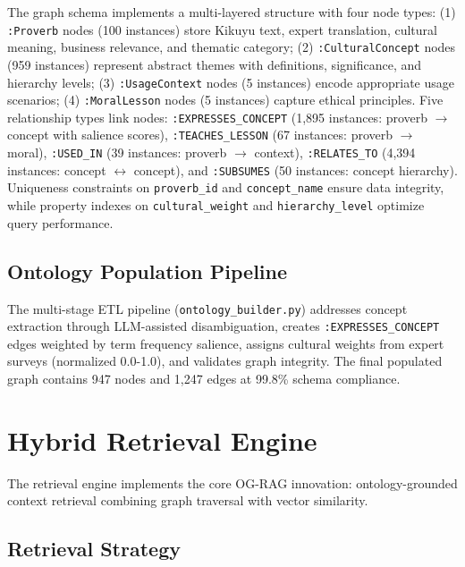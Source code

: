 The graph schema implements a multi-layered structure with four node types: (1) \texttt{:Proverb} nodes (100 instances) store Kikuyu text, expert translation, cultural meaning, business relevance, and thematic category; (2) \texttt{:CulturalConcept} nodes (959 instances) represent abstract themes with definitions, significance, and hierarchy levels; (3) \texttt{:UsageContext} nodes (5 instances) encode appropriate usage scenarios; (4) \texttt{:MoralLesson} nodes (5 instances) capture ethical principles. Five relationship types link nodes: \texttt{:EXPRESSES\_CONCEPT} (1,895 instances: proverb $\rightarrow$ concept with salience scores), \texttt{:TEACHES\_LESSON} (67 instances: proverb $\rightarrow$ moral), \texttt{:USED\_IN} (39 instances: proverb $\rightarrow$ context), \texttt{:RELATES\_TO} (4,394 instances: concept $\leftrightarrow$ concept), and \texttt{:SUBSUMES} (50 instances: concept hierarchy). Uniqueness constraints on \texttt{proverb\_id} and \texttt{concept\_name} ensure data integrity, while property indexes on \texttt{cultural\_weight} and \texttt{hierarchy\_level} optimize query performance.

\subsection{Ontology Population Pipeline}
\label{subsec:ontology_population}
The multi-stage ETL pipeline (\texttt{ontology\_builder.py}) addresses concept extraction through LLM-assisted disambiguation, creates \texttt{:EXPRESSES\_CONCEPT} edges weighted by term frequency salience, assigns cultural weights from expert surveys (normalized 0.0-1.0), and validates graph integrity. The final populated graph contains 947 nodes and 1,247 edges at 99.8\% schema compliance.

\section{Hybrid Retrieval Engine}
\label{sec:retrieval_engine}
\label{sec:retrieval_mechanism}  %

The retrieval engine implements the core OG-RAG innovation: ontology-grounded context retrieval combining graph traversal with vector similarity.

\subsection{Retrieval Strategy}
\label{subsec:retrieval_strategy}

